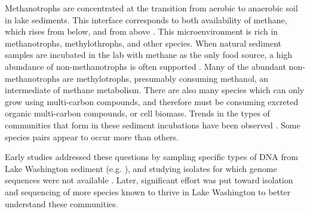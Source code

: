 Methanotrophs are concentrated at the transition from aerobic to anaerobic soil in lake sediments.
This interface corresponds to both availability of methane, which rises from below, and  from above \cite{lidstrom1984gradients, kuivilal1988, auman2000gradients}. %
This microenvironment is rich in methanotrophs, methylothrophs, and other species.
When natural sediment samples are incubated in the lab with methane as the only food source, a high abundance of non-methanotrophs is often supported \cite{oshkin2015LW}.
Many of the abundant non-methanotrophs are methylotrophs, presumably consuming methanol, an intermediate of methane metabolism.
There are also many species which can only grow using multi-carbon compounds, and therefore must be consuming excreted organic multi-carbon compounds, or cell biomass.
Trends in the types of communities that form in these sediment incubations have been observed  \cite{oshkin2015LW}.
Some species pairs appear to occur more than others.

Early studies addressed these questions by sampling specific types of DNA from Lake Washington sediment (e.g. \cite{auman2002, costello2002, nercessian2005}), and studying isolates for which genome sequences were not available \cite{auman2000gradients, kalyuzhnaya2005Methylosarcina, kalyuzhnaya2006methylotenera}.
Later, significant effort was put toward isolation and sequencing of more species known to thrive in Lake Washington
    \cite{kalyuzhnaya2011isolates, beck2015isolates, mctaggart2015, kalyuzhnaya2015} to better understand these communities.

